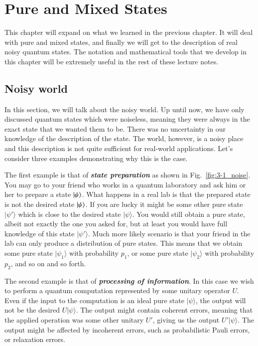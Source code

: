 \chapter[Pure and Mixed States]{Pure and Mixed States}
\label{sec:3_pure_mixed}

This chapter will expand on what we learned in the previous chapter.
It will deal with pure and mixed states, and finally we will get to the description of real noisy quantum states.
The notation and mathematical tools that we develop in this chapter will be extremely useful in the rest of these lecture notes.

\section{Noisy world}
\label{sec:3-1_noisy_world}

In this section, we will talk about the noisy world.
Up until now, we have only discussed quantum states which were noiseless, meaning they
were always in the exact state that we wanted them to be.
There was no uncertainty in our knowledge of the description of the state.
The world, however, is a noisy place and this description is not quite sufficient for real-world applications.
Let's consider three examples demonstrating why this is the case.

The first example is that of \textit{\textbf{state preparation}} as shown in Fig.~\ref{fig:3-1_noise}.
You may go to your friend who works in a quantum laboratory and ask him or her to prepare
a state $\left| \psi \right\rangle$.
What happens in a real lab is that the prepared
state is not the desired state $\left| \psi \right\rangle$.
If you are lucky it might be some other pure state $|\psi'\rangle$ which is close to the desired state $|\psi\rangle$.
You would still obtain a pure state, albeit not exactly the one you asked for, but at least you would have full knowledge of this state $|\psi'\rangle$.
Much more likely scenario is that your friend in the lab can only produce a distribution of pure states.
This means that we obtain some pure state $|\psi_1\rangle$ with probability $p_1$, or some pure state $|\psi_2\rangle$ with probability $p_2$, and so on and so forth.

The second example is that of \textit{\textbf{processing of information}}.
In this case we wish to perform a quantum computation represented by some unitary operator $U$.
Even if the input to the computation is an ideal pure state $|\psi\rangle$, the output will not be the desired $U|\psi\rangle$.
The output might contain coherent errors, meaning that the applied operation was some other unitary $U'$, giving us the output $U'|\psi\rangle$.
The output might be affected by incoherent errors, such as probabilistic Pauli errors, or relaxation errors.

